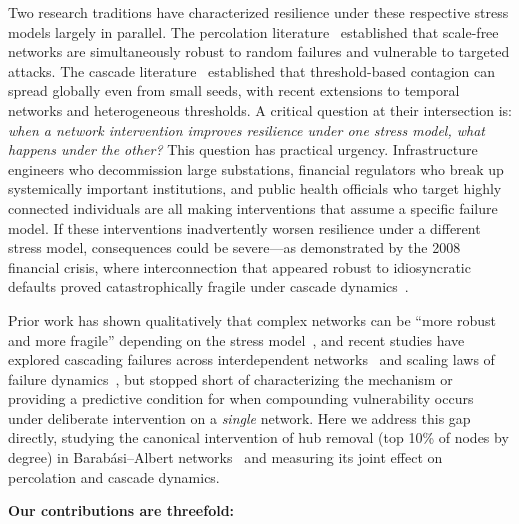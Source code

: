 \documentclass[aps,pre,twocolumn,superscriptaddress,showpacs]{revtex4-2}
\begin{document}
Two research traditions have characterized resilience under these respective stress models largely in parallel. The percolation literature~\cite{Barabasi1999,Albert2000,Cohen2000,Cohen2001,Geng2021} established that scale-free networks are simultaneously robust to random failures and vulnerable to targeted attacks. The cascade literature~\cite{Watts2002,Gleeson2007,Dodds2004,Nishioka2022,Karimi2021} established that threshold-based contagion can spread globally even from small seeds, with recent extensions to temporal networks and heterogeneous thresholds. A critical question at their intersection is: \emph{when a network intervention improves resilience under one stress model, what happens under the other?} This question has practical urgency. Infrastructure engineers who decommission large substations, financial regulators who break up systemically important institutions, and public health officials who target highly connected individuals are all making interventions that assume a specific failure model. If these interventions inadvertently worsen resilience under a different stress model, consequences could be severe---as demonstrated by the 2008 financial crisis, where interconnection that appeared robust to idiosyncratic defaults proved catastrophically fragile under cascade dynamics~\cite{Battiston2012}.

Prior work has shown qualitatively that complex networks can be ``more robust and more fragile'' depending on the stress model~\cite{Albert2000,Callaway2000}, and recent studies have explored cascading failures across interdependent networks~\cite{Valdez2020,Xu2021} and scaling laws of failure dynamics~\cite{Pal2023}, but stopped short of characterizing the mechanism or providing a predictive condition for when compounding vulnerability occurs under deliberate intervention on a \emph{single} network. Here we address this gap directly, studying the canonical intervention of hub removal (top 10\% of nodes by degree) in Barab\'asi--Albert networks~\cite{Barabasi1999} and measuring its joint effect on percolation and cascade dynamics.

\textbf{Our contributions are threefold:}
\end{document}
